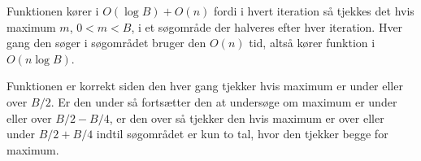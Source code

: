\documentclass[12pt]{article}
\begin{document}
Funktionen kører i $O(\log{B}) + O(n)$ fordi i hvert iteration så tjekkes det hvis maximum $m$, $0 < m < B$, i et søgområde der halveres efter hver iteration. Hver gang den søger i søgområdet bruger den $O(n)$ tid, altså kører funktion i $O(n\log B)$.

Funktionen er korrekt siden den hver gang tjekker hvis maximum er under eller over $B/2$. Er den under så fortsætter den at undersøge om maximum er under eller over $B/2-B/4$, er den over så tjekker den hvis maximum er over eller under $B/2+B/4$ indtil søgområdet er kun to tal, hvor den tjekker begge for maximum.
\end{document}

